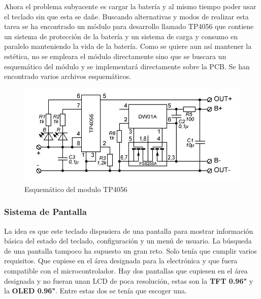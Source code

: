 Ahora el problema subyacente es cargar la batería y al mismo tiempo poder usar el teclado sin que esta se dañe. Buscando alternativas y modos de realizar esta tarea se ha encontrado un módulo para desarrollo llamado TP4056 que contiene un sistema de protección de la batería y un sistema de carga y consumo en paralelo manteniendo la vida de la batería. Como se quiere aun así mantener la estética, no se empleara el módulo directamente sino que se buscara un esquemático del módulo y se implementará directamente sobre la \gls{PCB}. Se han encontrado varios archivos esquemáticos.

\begin{figure}[H]
    \centering
    \includegraphics[width=1\textwidth]{imagenes/Capitulos/Cap03/TP4056Schematic.png}
    \caption{Esquemático del modulo TP4056 \cite{TP4056SchematicInternet}}
    \label{fig:SchemeTP4056}
\end{figure}

\subsubsection{Sistema de Pantalla} \label{DiseñoPantalla}
La idea es que este teclado dispusiera de una pantalla para mostrar información básica del estado del teclado, configuración y un menú de usuario. La búsqueda de una pantalla tampoco ha supuesto un gran reto. Solo tenía que cumplir varios requisitos. Que cupiese en el área designada para la electrónica y que fuera compatible con el microcontrolador. Hay dos pantallas que cupiesen en el área designada y no fueran unan \gls{LCD} de poca resolución, estas son la \textbf{\gls{TFT} 0.96"} y la \textbf{\gls{OLED} 0.96"}. Entre estas dos se tenía que escoger una.

